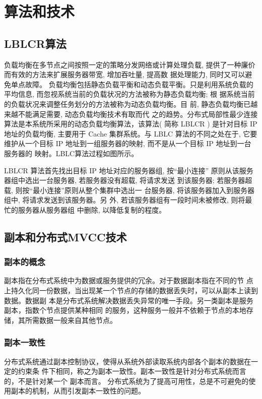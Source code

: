 \section{算法和技术}
\subsection{LBLCR算法}
负载均衡在多节点之间按照一定的策略分发网络或计算处理负载,
提供了一种廉价而有效的方法来扩展服务器带宽, 增加吞吐量, 提高数
据处理能力, 同时又可以避免单点故障。
负载均衡包括静态负载平衡和动态负载平衡。只是利用系统负载的
平均信息, 而忽视系统当前的负载状况的方法被称为静态负载均衡; 根
据系统当前的负载状况来调整任务划分的方法被称为动态负载均衡。目
前, 静态负载均衡已越来越不能满足需要, 动态负载均衡技术有取而代
之的趋势。分布式局部性最少连接算法是本系统所采用的动态负载均衡算法，该算法( 简称 LBLCR ) 是针对目标 IP 地址的负载均衡, 主要用于
Cache 集群系统。与 LBLC 算法的不同之处在于, 它要维护从一个目标 IP
地址到一组服务器的映射, 而不是从一个目标 IP 地址到一台服务器的
映射。LBLC算法过程如图所示。

LBLCR 算法首先找出目标 IP 地址对应的服务器组, 按“最小连接”
原则从该服务器组中选出一台服务器, 若服务器没有超载, 将请求发送
到该服务器; 若服务器超载, 则按“最小连接”原则从整个集群中选出一
台服务器, 将该服务器加入到服务器组中, 将请求发送到该服务器。另
外, 若该服务器组有一段时间未被修改, 则将最忙的服务器从服务器组
中删除, 以降低复制的程度。
\subsection{副本和分布式MVCC技术}
\subsubsection{副本的概念}
副本指在分布式系统中为数据或服务提供的冗余。对于数据副本指在不同的节
点上持久化同一份数据，当出现某一个节点的存储的数据丢失时，可以从副本上读到数据。数据副
本是分布式系统解决数据丢失异常的唯一手段。另一类副本是服务副本，指数个节点提供某种相同
的服务，这种服务一般并不依赖于节点的本地存储，其所需数据一般来自其他节点。
\subsubsection{副本一致性}
分布式系统通过副本控制协议，使得从系统外部读取系统内部各个副本的数据在一定的约束条
件下相同，称之为副本一致性。副本一致性是针对分布式系统而言的，不是针对某一个
副本而言。
分布式系统为了提高可用性，总是不可避免的使用副本的机制，从而引发副本一致性的问题。
